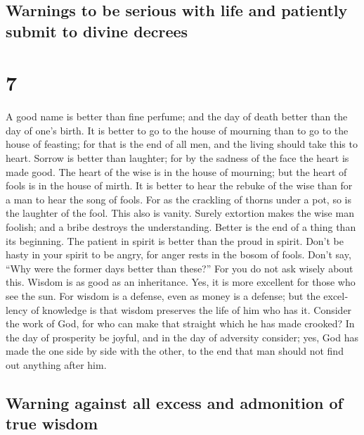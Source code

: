 \begin{paracol}{2}
\begin{otherlanguage}{english}
\hypertarget{warnings-to-be-serious-with-life-and-patiently-submit-to-divine-decrees}{%
\subsection{Warnings to be serious with life and patiently submit to
divine
decrees}\label{warnings-to-be-serious-with-life-and-patiently-submit-to-divine-decrees}}

\hypertarget{section-13}{%
\section{7}\label{section-13}}

 A good name is better than fine perfume; and the day of
death better than the day of one's birth.  It is better to
go to the house of mourning than to go to the house of feasting; for
that is the end of all men, and the living should take this to heart.
 Sorrow is better than laughter; for by the sadness of the
face the heart is made good.  The heart of the wise is in
the house of mourning; but the heart of fools is in the house of mirth.
 It is better to hear the rebuke of the wise than for a
man to hear the song of fools.  For as the crackling of
thorns under a pot, so is the laughter of the fool. This also is vanity.
 Surely extortion makes the wise man foolish; and a bribe
destroys the understanding.  Better is the end of a thing
than its beginning. The patient in spirit is better than the proud in
spirit.  Don't be hasty in your spirit to be angry, for
anger rests in the bosom of fools.  Don't say, ``Why were
the former days better than these?'' For you do not ask wisely about
this.  Wisdom is as good as an inheritance. Yes, it is
more excellent for those who see the sun.  For wisdom is
a defense, even as money is a defense; but the excellency of knowledge
is that wisdom preserves the life of him who has it. 
Consider the work of God, for who can make that straight which he has
made crooked?  In the day of prosperity be joyful, and in
the day of adversity consider; yes, God has made the one side by side
with the other, to the end that man should not find out anything after
him.

\hypertarget{warning-against-all-excess-and-admonition-of-true-wisdom}{%
\subsection{Warning against all excess and admonition of true
wisdom}\label{warning-against-all-excess-and-admonition-of-true-wisdom}}


\end{otherlanguage}
\end{paracol}
